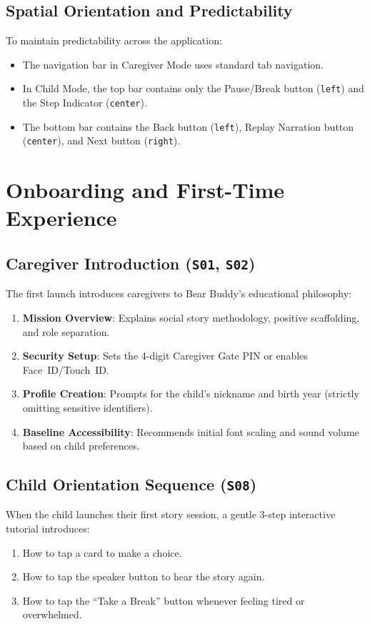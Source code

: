 \subsection{Spatial Orientation and Predictability}

To maintain predictability across the application:
\begin{itemize}
    \item The navigation bar in Caregiver Mode uses standard tab navigation.
    \item In Child Mode, the top bar contains only the Pause/Break button (\texttt{left}) and the Step Indicator (\texttt{center}).
    \item The bottom bar contains the Back button (\texttt{left}), Replay Narration button (\texttt{center}), and Next button (\texttt{right}).
\end{itemize}

\section{Onboarding and First-Time Experience}

\subsection{Caregiver Introduction (\texttt{S01}, \texttt{S02})}

The first launch introduces caregivers to Bear Buddy's educational philosophy:
\begin{enumerate}
    \item \textbf{Mission Overview}: Explains social story methodology, positive scaffolding, and role separation.
    \item \textbf{Security Setup}: Sets the 4-digit Caregiver Gate PIN or enables Face~ID/Touch~ID.
    \item \textbf{Profile Creation}: Prompts for the child's nickname and birth year (strictly omitting sensitive identifiers).
    \item \textbf{Baseline Accessibility}: Recommends initial font scaling and sound volume based on child preferences.
\end{enumerate}

\subsection{Child Orientation Sequence (\texttt{S08})}

When the child launches their first story session, a gentle 3-step interactive tutorial introduces:
\begin{enumerate}
    \item How to tap a card to make a choice.
    \item How to tap the speaker button to hear the story again.
    \item How to tap the ``Take a Break'' button whenever feeling tired or overwhelmed.
\end{enumerate}

